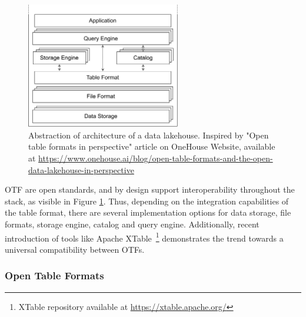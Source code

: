 \begin{figure}[!ht]
    \begin{center}
      \includegraphics[width=0.6\textwidth]{figures/2-background_and_related_work/lakehouse_schema.png}
    \end{center}
    \caption[Architecture of data lakehouse]{Abstraction of architecture of a data lakehouse. Inspired by "Open table formats in perspective" article on OneHouse Website, available at \url{https://www.onehouse.ai/blog/open-table-formats-and-the-open-data-lakehouse-in-perspective}}
    \label{fig:lakehouse_schema}
\end{figure}

\gls{OTF} are open standards, and by design support interoperability throughout the stack, as visible in Figure \ref{fig:lakehouse_schema}. Thus, depending on the integration capabilities of the table format, there are several implementation options for data storage, file formats, storage engine, catalog and query engine. Additionally, recent introduction of tools like Apache XTable~\footnote{XTable repository available at \url{https://xtable.apache.org/}} demonstrates the trend towards a universal compatibility between \glspl{OTF}.


\subsubsection*{Open Table Formats}

